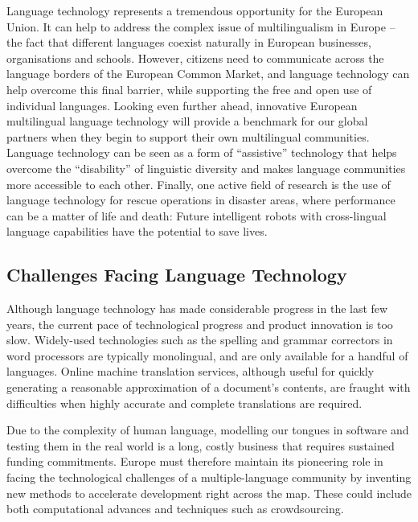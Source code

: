 \begin{multicols}{2}
Language technology represents a tremendous opportunity for the European Union. It can help to address the complex issue of multilingualism in Europe – the fact that different languages coexist naturally in European businesses, organisations and schools. However, citizens need to communicate across the language borders of the European Common Market, and language technology can help overcome this final barrier, while supporting the free and open use of individual languages. Looking even further ahead, innovative European multilingual language technology will provide a benchmark for our global partners when they begin to support their own multilingual communities. Language technology can be seen as a form of “assistive” technology that helps overcome the “disability” of linguistic diversity and makes language communities more accessible to each other. Finally, one active field of research is the use of language technology for rescue operations in disaster areas, where performance can be a matter of life and death: Future intelligent robots with cross-lingual language capabilities have the potential to save lives.

\subsection{Challenges Facing Language Technology}

Although language technology has made considerable progress in the last few years, the current pace of technological progress and product innovation is too slow. Widely-used technologies such as the spelling and grammar correctors in word processors are typically monolingual, and are only available for a handful of languages. Online machine translation services, although useful for quickly generating a reasonable approximation of a document’s contents, are fraught with difficulties when highly accurate and complete translations are required. 



Due to the complexity of human language, modelling our tongues in software and testing them in the real world is a long, costly business that requires sustained funding commitments. Europe must therefore maintain its pioneering role in facing the technological challenges of a multiple-language community by inventing new methods to accelerate development right across the map. These could include both computational advances and techniques such as crowdsourcing.


\end{multicols}
